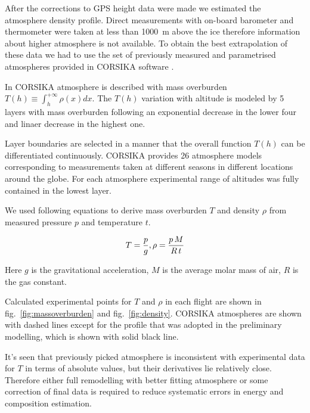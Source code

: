 \documentclass[final,5p,times,twocolumn]{elsarticle}
\begin{document}
After the corrections to GPS height data were made we estimated the atmosphere density profile. Direct measurements with on-board barometer and thermometer were taken at less than 1000~m above the ice therefore information about higher atmosphere is not available. To obtain the best extrapolation of these data we had to use the set of previously measured and parametrised atmospheres provided in CORSIKA software \cite{hec98}.

In CORSIKA atmosphere is described with mass overburden $T(h) \equiv \int_{h}^{+\infty} \rho(x) dx$. The $T(h)$ variation with altitude is modeled by 5 layers with mass overburden following an exponential decrease in the lower four and linaer decrease in the highest one.


Layer boundaries are selected in a manner that the overall function $T(h)$ can be differentiated continuously. CORSIKA provides 26 atmosphere models corresponding to measurements taken at different seasons in different locations around the globe. For each atmosphere experimental range of altitudes was fully contained in the lowest layer.

We used following equations to derive mass overburden $T$ and density $\rho$ from measured pressure $p$ and temperature $t$.

\begin{equation}
T     = \frac{p}{g}, \\
\rho  = \frac{p \, M}{R \, t} \\
\end{equation}

Here $g$ is the gravitational acceleration, $M$ is the average molar mass of air, $R$ is the gas constant.

Calculated experimental points for $T$ and $\rho$ in each flight are shown in fig.~\ref{fig:massoverburden} and fig.~\ref{fig:density}. CORSIKA atmospheres are shown with dashed lines except for the profile that was adopted in the preliminary modelling, which is shown with solid black line.

It's seen that previously picked atmosphere is inconsistent with experimental data for $T$ in terms of absolute values, but their derivatives lie relatively close. Therefore either full remodelling with better fitting atmosphere or some correction of final data is required to reduce systematic errors in energy and composition estimation.
\end{document}
